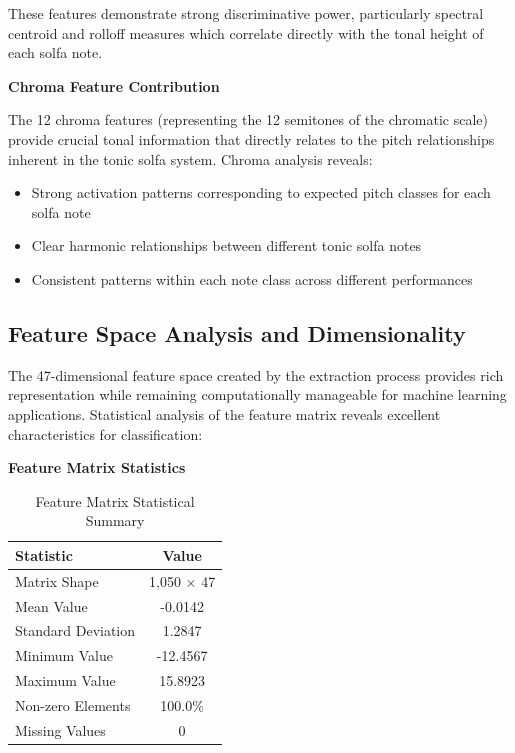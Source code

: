 \documentclass[12pt,a4paper]{article}
\begin{document}
These features demonstrate strong discriminative power, particularly spectral centroid and rolloff measures which correlate directly with the tonal height of each solfa note.

\textbf{Chroma Feature Contribution}

The 12 chroma features (representing the 12 semitones of the chromatic scale) provide crucial tonal information that directly relates to the pitch relationships inherent in the tonic solfa system. Chroma analysis reveals:

\begin{itemize}
\item Strong activation patterns corresponding to expected pitch classes for each solfa note
\item Clear harmonic relationships between different tonic solfa notes
\item Consistent patterns within each note class across different performances
\end{itemize}

\subsection{Feature Space Analysis and Dimensionality}

The 47-dimensional feature space created by the extraction process provides rich representation while remaining computationally manageable for machine learning applications. Statistical analysis of the feature matrix reveals excellent characteristics for classification:

\textbf{Feature Matrix Statistics}

\begin{table}[H]
\centering
\caption{Feature Matrix Statistical Summary}
\label{tab:feature_statistics}
\begin{tabular}{@{}lc@{}}
\toprule
\textbf{Statistic} & \textbf{Value} \\
\midrule
Matrix Shape & 1,050 × 47 \\
Mean Value & -0.0142 \\
Standard Deviation & 1.2847 \\
Minimum Value & -12.4567 \\
Maximum Value & 15.8923 \\
Non-zero Elements & 100.0\% \\
Missing Values & 0 \\
\bottomrule
\end{tabular}
\end{table}
\end{document}
